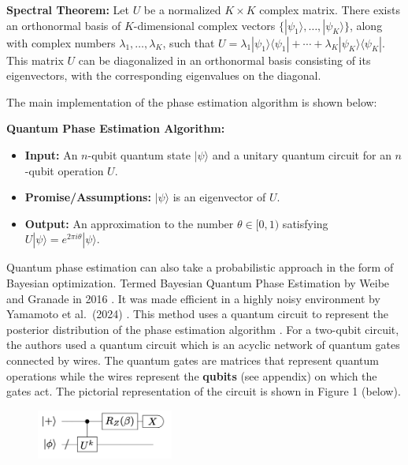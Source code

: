 \documentclass[
]{article}
\begin{document}
\begin{mdframed}
\textbf{Spectral Theorem:}
Let \( U \) be a normalized \( K \times K \) complex matrix. There exists an orthonormal basis of \( K \)-dimensional complex vectors \( \{|\psi_1\rangle, \dots, |\psi_K\rangle\} \), along with complex numbers \( \lambda_1, \dots, \lambda_K \), such that 
\( U = \lambda_1 |\psi_1\rangle \langle \psi_1| + \cdots + \lambda_K |\psi_K\rangle \langle \psi_K|.\)
This matrix \( U \) can be diagonalized in an orthonormal basis consisting of its eigenvectors, with the corresponding eigenvalues on the diagonal.
\end{mdframed}
\vspace{-0.1cm}

The main implementation of the phase estimation algorithm is shown
below:

\begin{mdframed}
\textbf{Quantum Phase Estimation Algorithm:}
\begin{itemize}
\item \textbf{Input:}
An \( n \)-qubit quantum state \( |\psi\rangle \) and a unitary quantum circuit for an \( n \)-qubit operation \( U \).
\item \textbf{Promise/Assumptions:}
\( |\psi\rangle \) is an eigenvector of \( U \).
\item \textbf{Output:}
An approximation to the number \( \theta \in [0,1) \) satisfying 
\(U |\psi\rangle = e^{2\pi i \theta} |\psi\rangle.\)
\end{itemize}
\end{mdframed}

Quantum phase estimation can also take a probabilistic approach in the
form of Bayesian optimization. Termed Bayesian Quantum Phase Estimation
by Weibe and Granade in 2016 \cite{Weibe2016}. It was made efficient in
a highly noisy environment by Yamamoto et al.~(2024)
\cite{Yamamoto2023}. This method uses a quantum circuit to represent the
posterior distribution of the phase estimation algorithm
\cite{Weibe2016, Yamamoto2023}. For a two-qubit circuit, the authors
used a quantum circuit which is an acyclic network of quantum gates
connected by wires. The quantum gates are matrices that represent
quantum operations while the wires represent the \textbf{qubits} (see
appendix) on which the gates act. The pictorial representation of the
circuit is shown in Figure 1 (below).

\begin{figure}
\includegraphics[width=0.40\textwidth]{tex/circuit.png}
\end{figure}
\end{document}
